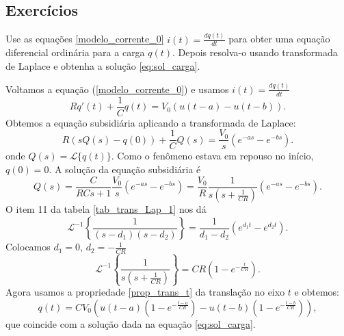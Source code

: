 \subsection*{Exercícios}
\begin{exer}
Use as equações \eqref{modelo_corrente_0} $i(t)=\frac{dq(t)}{dt}$ para obter uma equação diferencial ordinária para a carga $q(t)$. Depois resolva-o usando transformada de Laplace e obtenha a solução \eqref{eq:sol_carga}.
\end{exer}
\begin{resp}
Voltamos a equação (\ref{modelo_corrente_0}) e usamos $i(t)=\frac{dq(t)}{dt}$
\begin{equation}
 Rq'(t)+\frac{1}{C}q(t)=V_0\left(u(t-a)-u(t-b)\right).
\end{equation}
Obtemos a equação subsidiária aplicando a transformada de Laplace:
\begin{equation*}
  R\left(sQ(s)-q(0)\right)+\frac{1}{C}Q(s)=\frac{V_0}{s}\left(e^{-as}-e^{-bs}\right).
\end{equation*}
onde $Q(s)=\mathcal{L}\{q(t)\}$. Como o fenômeno estava em repouso no início, $q(0)=0$. A solução da equação subsidiária é
\begin{equation}
Q(s)=\frac{C}{RCs+1}\frac{V_0}{s}\left(e^{-as}-e^{-bs}\right)=\frac{V_0}{R}\frac{1}{s\left(s+\frac{1}{CR}\right)}\left(e^{-as}-e^{-bs}\right).
\end{equation}
O item 11 da tabela \ref{tab_trans_Lap_1} nos dá
\begin{equation}
\mathcal{L}^{-1}\left\{\frac{1}{(s-d_1)(s-d_2)}\right\}=\frac{1}{d_1-d_2}\left(e^{d_1t}-e^{d_2t}\right).
\end{equation}
Colocamos $d_1=0$, $d_2=-\frac{1}{CR}$
\begin{equation}
\mathcal{L}^{-1}\left\{\frac{1}{s\left(s+\frac{1}{CR}\right)}\right\}=CR\left(1-e^{-\frac{t}{CR}}\right).
\end{equation}
Agora usamos a propriedade \ref{prop_trans_t} da translação no eixo $t$ e obtemos:
\begin{equation}
q(t)=CV_0\left(u(t-a)\left(1-e^{-\frac{t-a}{CR}}\right)-u(t-b)\left(1-e^{-\frac{t-b}{CR}}\right) \right),
\end{equation}
que coincide com a solução dada na equação \eqref{eq:sol_carga}.
\end{resp}










